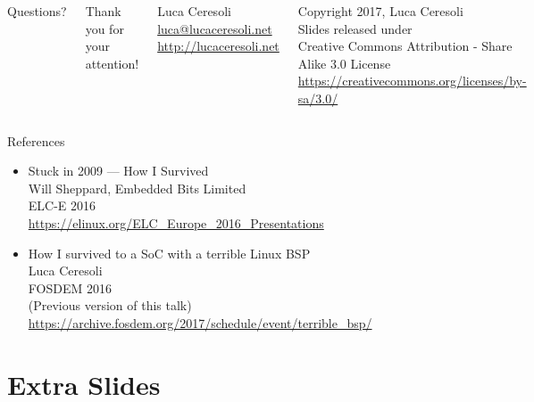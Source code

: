 \documentclass[xetex,table,aspectratio=169]{beamer}
\begin{document}
\begin{frame}
  \begin{columns}
    \center

    {\Huge Questions?}

    \center

    {\Large Thank you for your attention!}

    \vspace{0.15\textheight}

    {\Large Luca Ceresoli}\\
    \href{mailto:luca@lucaceresoli.net}{luca@lucaceresoli.net}\\
    \url{http://lucaceresoli.net}

    \vspace{0.05\textheight}

    \tiny
    \textcopyright{} Copyright 2017, Luca Ceresoli\\
    Slides released under\\
    Creative Commons Attribution - Share Alike 3.0 License \\
    \url{https://creativecommons.org/licenses/by-sa/3.0/} \\
\end{columns}
\end{frame}

\begin{frame}{References}
  \begin{itemize}
    \item
      Stuck in 2009 --- How I Survived\\
      Will Sheppard, Embedded Bits Limited\\
      ELC-E 2016\\
      {\scriptsize\url{https://elinux.org/ELC_Europe_2016_Presentations}}
    \item
      How I survived to a SoC with a terrible Linux BSP\\
      Luca Ceresoli\\
      FOSDEM 2016\\
      (Previous version of this talk)\\
      {\scriptsize\url{https://archive.fosdem.org/2017/schedule/event/terrible_bsp/}}
  \end{itemize}
\end{frame}

\appendix

\section{Extra Slides}
\end{document}
